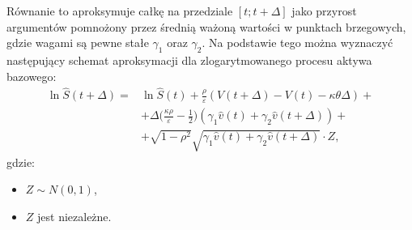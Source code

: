 \documentclass{pracamgr}
\begin{document}
Równanie to aproksymuje całkę na przedziale $[t; t + \Delta]$ 
jako przyrost argumentów pomnożony przez średnią ważoną wartości w punktach brzegowych, gdzie wagami 
są pewne stałe $\gamma_1$ oraz $\gamma_2$. Na podstawie tego można wyznaczyć 
następujący schemat aproksymacji dla zlogarytmowanego procesu aktywa bazowego:
\begin{equation}
\begin{aligned}
\label{eq:lnxhatt}
\ln \hat{S}(t + \Delta) = & \ln \hat{S}(t)  + \frac{\rho}{\varepsilon} (V(t + \Delta)  - V(t) - \kappa \theta \Delta) + \\
& + \Delta \Big( \frac{\kappa \rho}{\varepsilon} - \frac{1}{2} \Big) (\gamma_1 \hat{v}(t) + \gamma_2 \hat{v}(t + \Delta)) + \\
& + \sqrt{1-\rho^2} \sqrt{\gamma_1 \hat{v}(t) + \gamma_2 \hat{v}(t + \Delta)} \cdot Z,
\end{aligned}
\end{equation}
gdzie: 
\begin{itemize}
  \item $Z \sim N(0,1)$,
  \item $Z$ jest niezależne.
\end{itemize}
\end{document}
